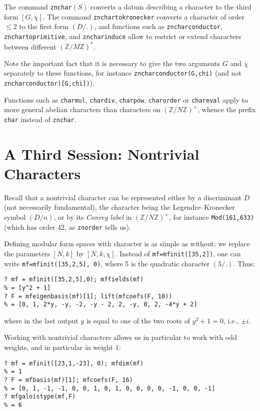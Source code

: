 \documentclass[11pt]{article}
\newcommand{\Z}{{\mathbb Z}}
\def\kbd#1{{\tt #1}}
\begin{document}
The command \kbd{znchar}$(S)$ converts a datum describing a character to the
third form $[G,\chi]$. The command \kbd{znchartokronecker} converts a
character of order $\leq 2$ to the first form $(D/.)$, and functions such
as \kbd{zncharconductor}, \kbd{znchartoprimitive}, and \kbd{zncharinduce}
allow to restrict or extend characters between different $(\Z/M\Z)^*$.

Note the important fact that it is necessary to give the two arguments $G$ and
$\chi$ separately to these functions, for instance \kbd{zncharconductor(G,chi)}
(and not \kbd{zncharconductor([G,chi])}).

Functions such as \kbd{charmul}, \kbd{chardiv}, \kbd{charpow},
\kbd{charorder} or \kbd{chareval} apply to more general abelian characters
than characters on $(\Z/N\Z)^\times$, whence the prefix \kbd{char} instead of
\kbd{znchar}.

\section{A Third Session: Nontrivial Characters}

Recall that a nontrivial character can be represented either by a discriminant
$D$ (not necessarily fundamental), the character being the Legendre--Kronecker
symbol $(D/n)$, or by its \emph{Conrey label} in $(\Z/N\Z)^\times$, for
instance \kbd{Mod(161,633)} (which has order 42, as \kbd{znorder} tells us).

Defining modular form spaces with character is as simple as without:
we replace the parameters $[N,k]$ by $[N,k,\chi]$.
Instead of \kbd{mf=mfinit([35,2])}, one can write
\kbd{mf=mfinit([35,2,5], 0)}, where 5 is the quadratic character $(5/.)$. Thus:

\begin{verbatim}
? mf = mfinit([35,2,5],0); mffields(mf)
% = [y^2 + 1]
? F = mfeigenbasis(mf)[1]; lift(mfcoefs(F, 10))
% = [0, 1, 2*y, -y, -2, -y - 2, 2, -y, 0, 2, -4*y + 2]
\end{verbatim}
where in the last output $y$ is equal to one of the two roots of $y^2+1=0$,
i.e., $\pm i$.

Working with nontrivial characters allows us in particular to work with odd
weights, and in particular in weight $1$:

\begin{verbatim}
? mf = mfinit([23,1,-23], 0); mfdim(mf)
% = 1
? F = mfbasis(mf)[1]; mfcoefs(F, 16)
% = [0, 1, -1, -1, 0, 0, 1, 0, 1, 0, 0, 0, 0, -1, 0, 0, -1]
? mfgaloistype(mf,F)
% = 6
\end{verbatim}
\end{document}

